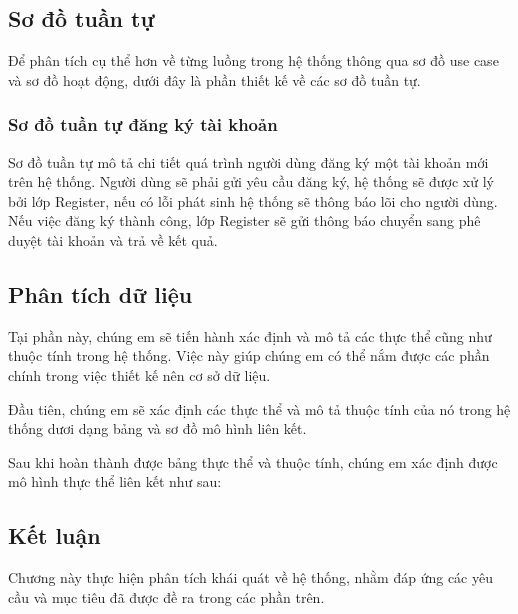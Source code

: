 \subsection{Sơ đồ tuần tự}
Để phân tích cụ thể hơn về từng luồng trong hệ thống thông qua sơ đồ use case và sơ đồ hoạt động, dưới đây là phần thiết kế
 về các sơ đồ tuần tự.

\subsubsection{Sơ đồ tuần tự đăng ký tài khoản}

Sơ đồ tuần tự mô tả chi tiết quá trình người dùng đăng ký một tài khoản mới trên hệ thống. Người dùng sẽ phải gửi yêu cầu đăng ký, hệ thống sẽ được xử lý
bởi lớp Register, nếu có lỗi phát sinh hệ thống sẽ thông báo lõi cho người dùng. Nếu việc đăng ký thành công, lớp Register sẽ gửi thông báo 
chuyển sang phê duyệt tài khoản và trả về kết quả.  

\subsection{Phân tích dữ liệu}

Tại phần này, chúng em sẽ tiến hành xác định và mô tả các thực thể cũng như
 thuộc tính trong hệ thống. Việc này giúp chúng em có thể nắm được các phần chính 
 trong việc thiết kế nên cơ sở dữ liệu.

Đầu tiên, chúng em sẽ xác định các thực thể và mô tả thuộc tính của nó trong hệ
thống dươi dạng bảng và sơ đồ mô hình liên kết. 


Sau khi hoàn thành được bảng thực thể và thuộc tính, chúng em xác định được mô hình thực thể liên kết như sau:

\subsection{Kết luận}

Chương này thực hiện phân tích khái quát về
 hệ thống, nhằm đáp ứng các yêu cầu và mục tiêu đã được đề ra trong các phần trên.

\newpage
